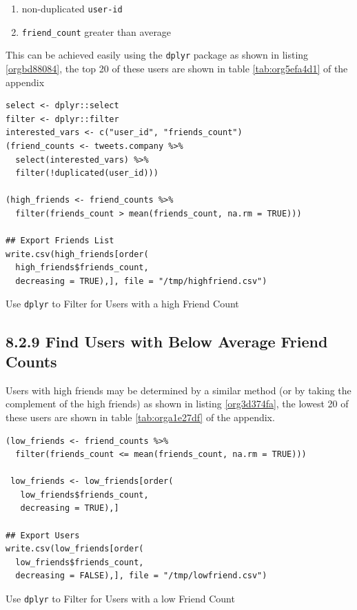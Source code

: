 \documentclass[11pt]{article}
\begin{document}
\begin{enumerate}
\item non-duplicated \texttt{user-id}
\item \texttt{friend\_count} greater than average
\end{enumerate}

This can be achieved easily using the \texttt{dplyr} package as shown in listing \ref{orgbd88084}, the top 20 of these users are shown in table \ref{tab:org5efa4d1} of the appendix

\begin{listing}[htbp]
\begin{verbatim}
select <- dplyr::select
filter <- dplyr::filter
interested_vars <- c("user_id", "friends_count")
(friend_counts <- tweets.company %>%
  select(interested_vars) %>%
  filter(!duplicated(user_id)))

(high_friends <- friend_counts %>%
  filter(friends_count > mean(friends_count, na.rm = TRUE)))

## Export Friends List
write.csv(high_friends[order(
  high_friends$friends_count,
  decreasing = TRUE),], file = "/tmp/highfriend.csv")
\end{verbatim}
\caption{\label{orgbd88084}Use \texttt{dplyr} to Filter for Users with a high Friend Count}
\end{listing}

\subsection{8.2.9 Find Users with Below Average Friend Counts}
\label{sec:org7a0aec2}
Users with high friends may be determined by a similar method (or by taking the complement of the high friends) as shown in listing \ref{org3d374fa}, the lowest 20 of these users are shown in table \ref{tab:orga1e27df} of the appendix.

\begin{listing}[htbp]
\begin{verbatim}
(low_friends <- friend_counts %>%
  filter(friends_count <= mean(friends_count, na.rm = TRUE)))

 low_friends <- low_friends[order(
   low_friends$friends_count,
   decreasing = TRUE),]

## Export Users
write.csv(low_friends[order(
  low_friends$friends_count,
  decreasing = FALSE),], file = "/tmp/lowfriend.csv")
\end{verbatim}
\caption{\label{org3d374fa}Use \texttt{dplyr} to Filter for Users with a low Friend Count}
\end{listing}
\end{document}
